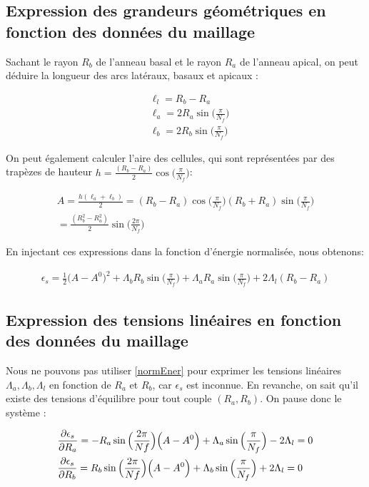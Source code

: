\documentclass[11pt,a4paper]{article}
\begin{document}
\subsection{Expression des grandeurs géométriques en fonction des données du maillage}

Sachant le rayon $R_b$ de l'anneau basal et le rayon $R_a$ de l'anneau apical, on peut déduire la longueur des arcs latéraux, basaux et apicaux :

\begin{align*}
    &\ell_l = R_b - R_a \\
    &\ell_a = 2R_a\sin\Big(\frac{\pi}{N_f}\Big) \\
    &\ell_b = 2R_b\sin\Big(\frac{\pi}{N_f}\Big)
\end{align*}

On peut également calculer l'aire des cellules, qui sont représentées par des trapèzes de hauteur $h = \frac{(R_b-R_a)}{2}\cos\Big(\frac{\pi}{N_f}\Big)$:

\begin{align*}
    A = \frac{h(\ell_a + \ell_b)}{2} = (R_b - R_a)\cos\Big(\frac{\pi}{N_f}\Big)(R_b + R_a)\sin\Big(\frac{\pi}{N_f}\Big) \\
    = \frac{(R_b^2 - R_a^2)}{2}\sin\Big(\frac{2\pi}{N_f}\Big)
\end{align*}


En injectant ces expressions dans la fonction d'énergie normalisée, nous obtenons:

\begin{align}\label{normEner}
    \epsilon_s =\frac{1}{2}\Big(A - A^0\Big)^2 + \Lambda_b R_b\sin\Big(\frac{\pi}{N_f}\Big) + \Lambda_a R_a\sin\Big(\frac{\pi}{N_f}\Big) + 2\Lambda_l(R_b - R_a)
\end{align}

\subsection{Expression des tensions linéaires en fonction des données du maillage}

Nous ne pouvons pas utiliser \eqref{normEner} pour exprimer les tensions linéaires $\Lambda_a, \Lambda_b, \Lambda_l$ en fonction de $R_a$ et $R_b$, car $\epsilon_s$ est inconnue. En revanche, on sait qu'il existe des tensions d'équilibre pour tout couple $(R_a, R_b)$. On pause donc le système :

\begin{subequations}{\label{prepartial}}
    \begin{align}
            &\frac{\partial \epsilon_s}{\partial R_a} = -R_a\sin\Big(\frac{2\pi}{Nf}\Big)\Big(A - A^0\Big)+\Lambda_a
            \sin\Big(\frac{\pi}{N_f}\Big)-2\Lambda_l = 0\label{prepartialA}\\
            &\frac{\partial \epsilon_s}{\partial R_b} = R_b\sin\Big(\frac{2\pi}{Nf}\Big)\Big(A - A^0\Big)+\Lambda_b \sin\Big(\frac{\pi}{N_f}\Big)+2\Lambda_l = 0\label{prepartialB}
    \end{align}
\end{subequations}
\end{document}
